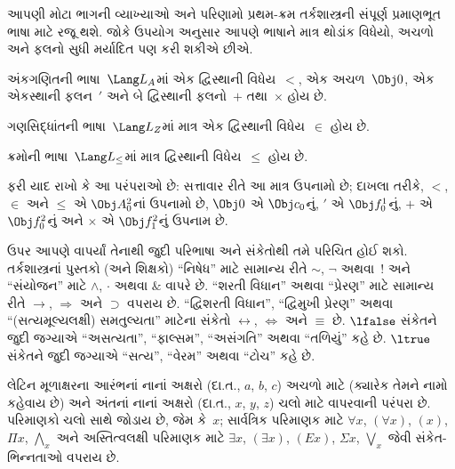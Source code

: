 આપણી મોટા ભાગની વ્યાખ્યાઓ અને પરિણામો પ્રથમ-ક્રમ તર્કશાસ્ત્રની
સંપૂર્ણ પ્રમાણભૂત ભાષા માટે રજૂ થશે. જોકે ઉપયોગ અનુસાર આપણે ભાષાને
માત્ર થોડાંક વિધેયો, અચળો અને ફલનો સુધી
મર્યાદિત પણ કરી શકીએ છીએ.

\begin{ex}
અંકગણિતની ભાષા~$\Lang L_A$માં એક દ્વિસ્થાની વિધેય~$<$, એક
અચળ~$\Obj 0$, એક એકસ્થાની ફલન~$\prime$ અને બે
દ્વિસ્થાની ફલનો~$+$ તથા~$\times$ હોય છે.
\end{ex}

\begin{ex}
ગણસિદ્ધાંતની ભાષા~$\Lang L_Z$માં માત્ર એક દ્વિસ્થાની
વિધેય~$\in$ હોય છે.
\end{ex}

\begin{ex}
ક્રમોની ભાષા~$\Lang L_\le$માં માત્ર દ્વિસ્થાની
વિધેય~$\le$ હોય છે.
\end{ex}

ફરી યાદ રાખો કે આ પરંપરાઓ છે: સત્તાવાર રીતે આ માત્ર ઉપનામો છે;
દાખલા તરીકે, $<$, $\in$ અને $\le$ એ $\Obj A^2_0$નાં ઉપનામો છે,
$\Obj 0$ એ $\Obj c_0$નું, $\prime$ એ $\Obj f^1_0$નું, $+$ એ
$\Obj f^2_0$નું અને $\times$ એ $\Obj f^2_1$નું ઉપનામ છે.






\begin{intro}
ઉપર આપણે વાપર્યાં તેનાથી જુદી પરિભાષા અને સંકેતોથી તમે પરિચિત હોઈ
શકો. તર્કશાસ્ત્રનાં પુસ્તકો (અને શિક્ષકો) ``નિષેધ'' માટે સામાન્ય રીતે
$\sim$, $\neg$ અથવા~! અને ``સંયોજન'' માટે $\wedge$, $\cdot$ અથવા
$\&$ વાપરે છે. ``શરતી વિધાન'' અથવા ``પ્રેરણ'' માટે સામાન્ય રીતે
$\rightarrow$, $\Rightarrow$ અને $\supset$ વપરાય છે.
``દ્વિશરતી વિધાન'', ``દ્વિમુખી પ્રેરણ'' અથવા
  ``(સત્યમૂલ્યલક્ષી) સમતુલ્યતા'' માટેના સંકેતો $\leftrightarrow$,
  $\Leftrightarrow$ અને $\equiv$ છે.
$\lfalse$ સંકેતને જુદી જગ્યાએ ``અસત્યતા'',
  ``ફાલ્સમ'', ``અસંગતિ'' અથવા ``તળિયું'' કહે છે.
$\ltrue$ સંકેતને જુદી જગ્યાએ ``સત્ય'',
  ``વેરમ'' અથવા ``ટોચ'' કહે છે.

લેટિન મૂળાક્ષરના આરંભનાં નાનાં અક્ષરો (દા.ત., $a$, $b$, $c$)
અચળો માટે (ક્યારેક તેમને નામો કહેવાય છે) અને અંતનાં નાનાં
અક્ષરો (દા.ત., $x$, $y$, $z$) ચલો માટે વાપરવાની પરંપરા
છે. પરિમાણકો ચલો સાથે જોડાય છે, જેમ કે~$x$; સાર્વત્રિક
પરિમાણક માટે $\forall x$, $(\forall x)$, $(x)$, $\Pi x$,
$\bigwedge_x$ અને અસ્તિત્વલક્ષી પરિમાણક માટે $\exists x$,
$(\exists x)$, $(Ex)$, $\Sigma x$, $\bigvee_x$ જેવી સંકેત-ભિન્નતાઓ
વપરાય છે.
\end{intro}

